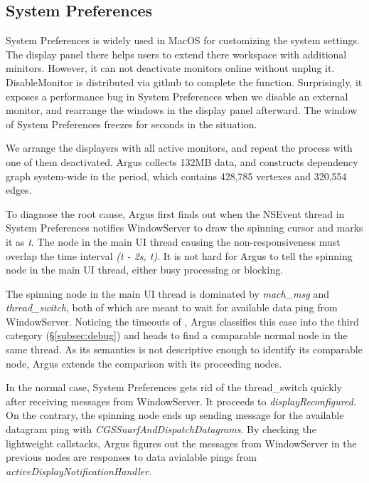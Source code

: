 \subsection{System Preferences}

System Preferences is widely used in MacOS for customizing the system settings.
The display panel there helps users to extend there workspace with additional
minitors. However, it can not deactivate monitors online without unplug it.
DisableMonitor is distributed via github to complete the function. Surprisingly,
it exposes a performance bug in System Preferences when we disable an external
monitor, and rearrange the windows in the display panel afterward. The window of
System Preferences freezes for seconds in the situation.

We arrange the displayers with all active monitors, and repeat the process with
one of them deactivated. Argus collects 132MB data, and constructs dependency
graph system-wide in the period, which contains 428,785 vertexes and 320,554
edges.

To diagnose the root cause, Argus first finds out when the NSEvent thread in
System Preferences notifies WindowServer to draw the spinning cursor and marks
it as \textit{t}. The node in the main UI thread causing the non-responsiveness
must overlap the time interval \textit{(t - 2s, t)}. It is not hard for
Argus to tell the spinning node in the main UI thread, either busy processing or
blocking.

The spinning node in the main UI thread is dominated by \textit{mach\_msg} and
\textit{thread\_switch}, both of which are meant to wait for available data
ping from WindowServer. Noticing the timeouts of , Argus
classifies this case into the third category (\S\ref{subsec:debug}) and heads
to find a comparable normal node in the same thread. As its semantics is not
descriptive enough to identify its comparable node, Argus extends the comparison
with its proceeding nodes.

In the normal case, System Preferences gets rid of the thread\_switch
quickly after receiving messages from WindowServer. It proceeds
to \textit{displayReconfigured}. On the contrary, the spinning
node ends up sending message for the available datagram ping with
\textit{CGSSnarfAndDispatchDatagrams}. By checking the lightweight callstacks,
Argus figures out the messages from WindowServer in the previous nodes are
responses to data avialable pings from \textit{activeDisplayNotificationHandler}.

